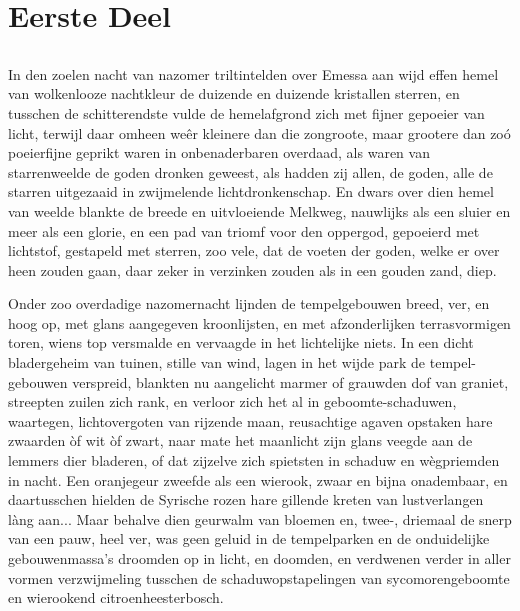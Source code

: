 \documentclass[a4paper, 12pt, oneside, dutch]{article}
\begin{document}
\setlength{\parskip}{1mm plus1mm minus1mm}
\tableofcontents
\clearpage
\section{Eerste Deel}
\subsection{}
\paragraph{}
In den zoelen nacht van nazomer triltintelden over Emessa aan wijd effen hemel van wolkenlooze nachtkleur de duizende en duizende kristallen sterren, en tusschen de schitterendste vulde de hemelafgrond zich met fijner gepoeier van licht, terwijl daar omheen weêr kleinere dan die zongroote, maar grootere dan zoó poeierfijne geprikt waren in onbenaderbaren overdaad, als waren van starrenweelde de goden dronken geweest, als hadden zij allen, de goden, alle de starren uitgezaaid in zwijmelende lichtdronkenschap. En dwars over dien hemel van weelde blankte de breede en uitvloeiende Melkweg, nauwlijks als een sluier en meer als een glorie, en een pad van triomf voor den oppergod, gepoeierd met lichtstof, gestapeld met sterren, zoo vele, dat de voeten der goden, welke er over heen zouden gaan, daar zeker in verzinken zouden als in een gouden zand, diep.

Onder zoo overdadige nazomernacht lijnden de tempelgebouwen breed, ver, en hoog op, met glans aangegeven kroonlijsten, en met afzonderlijken terrasvormigen toren, wiens top versmalde en vervaagde in het lichtelijke niets. In een dicht bladergeheim van tuinen, stille van wind, lagen in het wijde park de tempel-gebouwen verspreid, blankten nu aangelicht marmer of grauwden dof van graniet, streepten zuilen zich rank, en verloor zich het al in geboomte-schaduwen, waartegen, lichtovergoten van rijzende maan, reusachtige agaven opstaken hare zwaarden òf wit òf zwart, naar mate het maanlicht zijn glans veegde aan de lemmers dier bladeren, of dat zijzelve zich spietsten in schaduw en wègpriemden in nacht. Een oranjegeur zweefde als een wierook, zwaar en bijna onadembaar, en daartusschen hielden de Syrische rozen hare gillende kreten van lustverlangen làng aan... Maar behalve dien geurwalm van bloemen en, twee-, driemaal de snerp van een pauw, heel ver, was geen geluid in de tempelparken en de onduidelijke gebouwenmassa's droomden op in licht, en doomden, en verdwenen verder in aller vormen verzwijmeling tusschen de schaduwopstapelingen van sycomorengeboomte en wierookend citroenheesterbosch.
\end{document}
